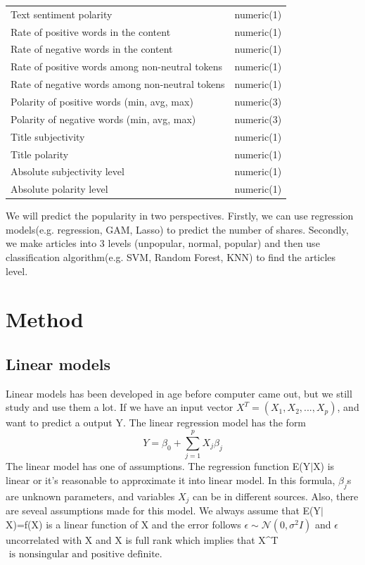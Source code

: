 \documentclass[11pt]{article}
\begin{document}
\begin{table}[h]
\begin{tabular}{ l | r }
            Text sentiment polarity & numeric(1) \\
            Rate of positive words in the content & numeric(1) \\
            Rate of negative words in the content & numeric(1) \\
            Rate of positive words among non-neutral tokens & numeric(1) \\
            Rate of negative words among non-neutral tokens & numeric(1) \\
            Polarity of positive words (min, avg, max) & numeric(3) \\
            Polarity of negative words (min, avg, max) & numeric(3) \\
            Title subjectivity & numeric(1) \\
            Title polarity & numeric(1) \\
            Absolute subjectivity level & numeric(1) \\
            Absolute polarity level & numeric(1) \\
            \hline\hline
        \end{tabular}
        \label{table:1}
    \end{table}

We will predict the popularity in two perspectives. Firstly, we can use regression models(e.g. regression, GAM, Lasso) to predict the number of shares. Secondly, we make articles into 3 levels (unpopular, normal, popular) and then use classification algorithm(e.g. SVM, Random Forest, KNN) to find the articles level.  

\section{Method}
\subsection{Linear models}  
Linear models has been developed in age before computer came out, but we still study and use them a lot. If we have an input vector $X^T=(X_1,X_2,...,X_p)$, and want to predict a output Y. The linear regression model has the form $$Y=\beta_0+\sum_{j=1}^{p} X_j\beta_j$$
The linear model has one of assumptions. The regression function E(Y$\mid$X) is linear or it's reasonable to approximate it into linear model. In this formula, $\beta_j$s are unknown parameters, and variables $X_j$ can be in different sources.  
Also, there are seveal assumptions made for this model. We always assume that E(Y$\mid$X)=f(X) is a linear function of X and the error follows $\epsilon \sim \mathcal N(0, \sigma^2I)$ and $\epsilon$ uncorrelated with X and X is full rank which implies that X^T $\text{ is nonsingular and positive definite.}$
\end{document}
